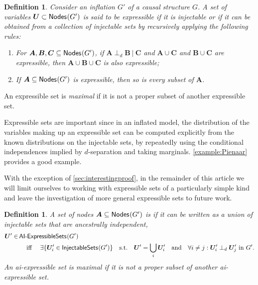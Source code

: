 \documentclass[aps,english,10pt,superscriptaddress,onecolumn,twoside,longbibliography,pra,floatfix,fleqn,nofootinbib]{revtex4-1}
\newcommand*{\tblue}[1]{{\color{MidnightBlue}{\textbf{#1}}}}
\newtheorem{definition}[theorem]{Definition}
\theoremstyle{definition}
\newcounter{example}[section]
\newcommand{\SmallNamedFunction}[3][]{\operatorname{\mathsf{#2}}_{#1}\parenths{#3}}
\newcommand{\nodes}[1]{\SmallNamedFunction{Nodes}{#1}}
\newcommand{\aindep}{\ensuremath{\perp_d}}
\DeclarePairedDelimiter{\parenths}{\lparen}{\rparen}
\begin{document}
\begin{definition}\label{def:expressible}
Consider an inflation $G'$ of a causal structure $G$.  A set of variables $\bm{U} \subset \nodes{G'}$ is said to be {\em expressible} if it is injectable or if it can be obtained from a collection of injectable sets by recursively applying the following rules:
\begin{enumerate}
\item For $\bm{A},\bm{B},\bm{C}\subseteq\nodes{G'}$, if $\bm{A}\aindep \bm{B}\:|\:\bm{C}$ and $\bm{A} \cup \bm{C}$ and $\bm{B} \cup \bm{C}$ are expressible, then $\bm{A}\cup \bm{B}\cup \bm{C}$ is also expressible;
\item If $\bm{A}\subseteq\nodes{G'}$ is expressible, then so is every subset of $\bm{A}$.
\end{enumerate}
\end{definition}
An expressible set is \emph{maximal} if it is not a proper subset of another expressible set.


Expressible sets are important since in an inflated model, the distribution of the variables making up an expressible set can be computed explicitly from the known distributions on the injectable sets, by repeatedly using the conditional independences implied by $d$-separation and taking marginals. \cref{example:Pienaar} provides a good example.

With the exception of \cref{sec:interestingproof}, in the remainder of this article we will limit ourselves to working with expressible sets of a particularly simple kind and leave the investigation of more general expressible sets to future work.

\begin{definition}
A set of nodes $\bm{A}\subseteq\nodes{G'}$ is \tblue{ai-expressible} if it can be written as a union of injectable sets that are ancestrally independent,
\begin{align}\label{eq:defpreinj}
\begin{split}
\bm{U}'\in & \SmallNamedFunction{AI-ExpressibleSets}{G'} \\
	& \quad\text{ iff }\quad  \exists \{ \bm{U}'_i \in \SmallNamedFunction{InjectableSets}{G'} \} \quad \text{s.t.}\quad \bm{U}'=\bigcup_i \bm{U}'_i  \quad\text{and} \quad  \forall i\ne j: \bm{U}'_i \aindep \bm{U}'_j \text{ in }G'.
\end{split}
\end{align}
An ai-expressible set is \emph{maximal} if it is not a proper subset of another ai-expressible set.
\end{definition}
\end{document}
